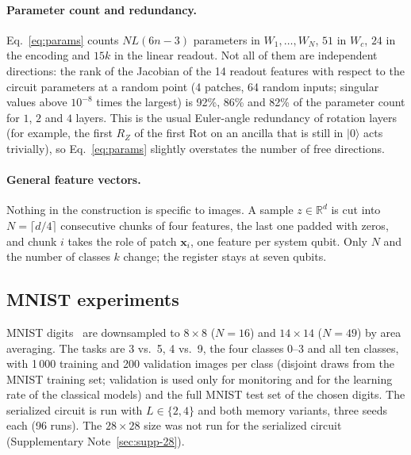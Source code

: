 \documentclass[11pt]{article}
\begin{document}
\paragraph{Parameter count and redundancy.}
Eq.~\eqref{eq:params} counts $N L(6n-3)$ parameters in $W_1,\dots,W_N$, $51$ in $W_c$, $24$ in the encoding and $15k$ in the linear readout. Not all of them are independent directions: the rank of the Jacobian of the 14 readout features with respect to the circuit parameters at a random point (4 patches, 64 random inputs; singular values above $10^{-8}$ times the largest) is 92\%, 86\% and 82\% of the parameter count for $1$, $2$ and $4$ layers. This is the usual Euler-angle redundancy of rotation layers (for example, the first $R_Z$ of the first $\mathrm{Rot}$ on an ancilla that is still in $\lvert0\rangle$ acts trivially), so Eq.~\eqref{eq:params} slightly overstates the number of free directions.

\paragraph{General feature vectors.}
Nothing in the construction is specific to images. A sample $z\in\mathbb{R}^d$ is cut into $N=\lceil d/4\rceil$ consecutive chunks of four features, the last one padded with zeros, and chunk $i$ takes the role of patch $\mathbf{x}_i$, one feature per system qubit. Only $N$ and the number of classes $k$ change; the register stays at seven qubits.

\subsection{MNIST experiments}
\label{sec:meth-mnist}

MNIST digits~\cite{lecun1998mnist} are downsampled to $8\times8$ ($N=16$) and $14\times14$ ($N=49$) by area averaging. The tasks are 3 vs.\ 5, 4 vs.\ 9, the four classes 0--3 and all ten classes, with 1\,000 training and 200 validation images per class (disjoint draws from the MNIST training set; validation is used only for monitoring and for the learning rate of the classical models) and the full MNIST test set of the chosen digits. The serialized circuit is run with $L\in\{2,4\}$ and both memory variants, three seeds each (96 runs). The $28\times28$ size was not run for the serialized circuit (Supplementary Note~\ref{sec:supp-28}).
\end{document}
